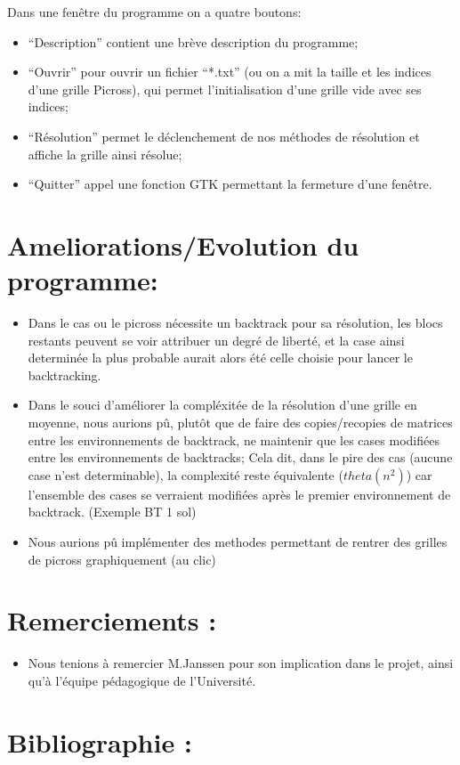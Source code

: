 \documentclass{article}
\begin{document}
Dans une fenêtre du programme on a quatre boutons:
\begin{itemize}
\item  ``Description'' contient une brève description du programme;
\item ``Ouvrir'' pour ouvrir un fichier ``*.txt'' (ou on a mit la taille et les indices d'une grille Picross), qui permet l'initialisation d'une grille vide avec ses indices;
\item ``Résolution'' permet le déclenchement de nos méthodes de résolution et affiche la grille ainsi résolue;
\item ``Quitter'' appel une fonction GTK permettant la fermeture d'une fenêtre.
\end{itemize}

\section{Ameliorations/Evolution du programme:}
\begin{itemize}
\item Dans le cas ou le picross nécessite un backtrack pour sa résolution, les blocs restants peuvent se voir attribuer un degré de liberté, et la case ainsi determinée la plus probable aurait alors été celle choisie pour lancer le backtracking.
\item Dans le souci d'améliorer la compléxitée de la résolution d'une grille en moyenne, nous aurions pû, plutôt que de faire des copies/recopies de matrices entre les environnements de backtrack, ne maintenir que les cases modifiées entre les environnements de backtracks;
Cela dit, dans le pire des cas (aucune case n'est determinable), la complexité reste équivalente ($theta(n^2)$) car l'ensemble des cases se verraient modifiées après le premier environnement de backtrack. (Exemple BT 1 sol)
\item Nous aurions pû implémenter des methodes permettant de rentrer des grilles de picross graphiquement (au clic)
\end{itemize}
\section{Remerciements :}
\begin{itemize}
\item Nous tenions à remercier M.Janssen pour son implication dans le projet, ainsi qu'à l'équipe pédagogique de l'Université.
\end{itemize}
\section{Bibliographie :}
\end{document}
